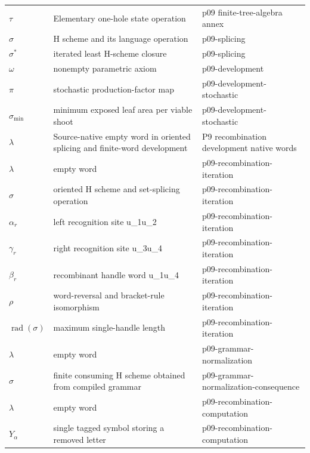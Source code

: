 \begin{longtable}{@{}p{}p{}p{}@{}}
\ensuremath{\tau} & Elementary one-hole state operation & p09 finite-\allowbreak{}tree-\allowbreak{}algebra annex \\
\(\sigma\) & H scheme and its language operation & p09-\allowbreak{}splicing \\
\(\sigma^*\) & iterated least H-scheme closure & p09-\allowbreak{}splicing \\
\(\omega\) & nonempty parametric axiom & p09-\allowbreak{}development \\
\(\pi\) & stochastic production-factor map & p09-\allowbreak{}development-\allowbreak{}stochastic \\
\(\sigma_{\min}\) & minimum exposed leaf area per viable shoot & p09-\allowbreak{}development-\allowbreak{}stochastic \\
\(\lambda\) & Source-native empty word in oriented splicing and finite-word development & P9 recombination development native words \\
\(\lambda\) & empty word & p09-\allowbreak{}recombination-\allowbreak{}iteration \\
\(\sigma\) & oriented H scheme and set-splicing operation & p09-\allowbreak{}recombination-\allowbreak{}iteration \\
\(\alpha_r\) & left recognition site u\_1u\_2 & p09-\allowbreak{}recombination-\allowbreak{}iteration \\
\(\gamma_r\) & right recognition site u\_3u\_4 & p09-\allowbreak{}recombination-\allowbreak{}iteration \\
\(\beta_r\) & recombinant handle word u\_1u\_4 & p09-\allowbreak{}recombination-\allowbreak{}iteration \\
\(\rho\) & word-reversal and bracket-rule isomorphism & p09-\allowbreak{}recombination-\allowbreak{}iteration \\
\(\operatorname{rad}(\sigma)\) & maximum single-handle length & p09-\allowbreak{}recombination-\allowbreak{}iteration \\
\(\lambda\) & empty word & p09-\allowbreak{}grammar-\allowbreak{}normalization \\
\(\sigma\) & finite consuming H scheme obtained from compiled grammar & p09-\allowbreak{}grammar-\allowbreak{}normalization-\allowbreak{}consequence \\
\(\lambda\) & empty word & p09-\allowbreak{}recombination-\allowbreak{}computation \\
\(Y_\alpha\) & single tagged symbol storing a removed letter & p09-\allowbreak{}recombination-\allowbreak{}computation \\

\end{longtable}
